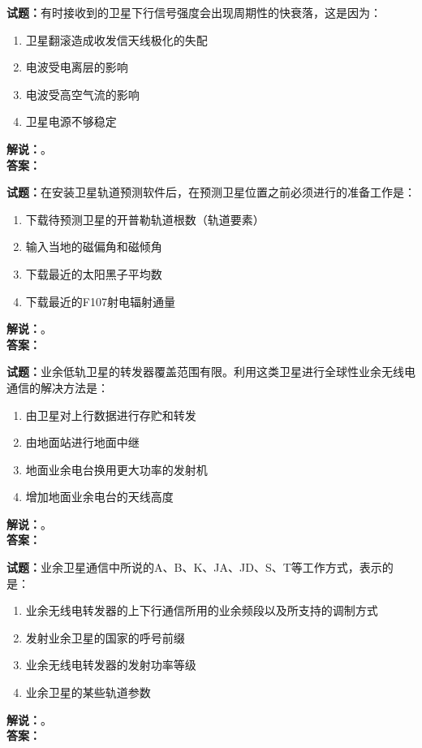 \documentclass{ctexbook}
\begin{document}
\noindent\textbf{试题：}有时接收到的卫星下行信号强度会出现周期性的快衰落，这是因为：
\begin{enumerate}[leftmargin=3em]
  \item 卫星翻滚造成收发信天线极化的失配
  \item 电波受电离层的影响
  \item 电波受高空气流的影响
  \item 卫星电源不够稳定
\end{enumerate}
\noindent\textbf{解说：}\textbf{}。\\\noindent\textbf{答案：}

\vspace{\baselineskip}

\noindent\textbf{试题：}在安装卫星轨道预测软件后，在预测卫星位置之前必须进行的准备工作是：
\begin{enumerate}[leftmargin=3em]
  \item 下载待预测卫星的开普勒轨道根数（轨道要素）
  \item 输入当地的磁偏角和磁倾角
  \item 下载最近的太阳黑子平均数
  \item 下载最近的F107射电辐射通量
\end{enumerate}
\noindent\textbf{解说：}\textbf{}。\\\noindent\textbf{答案：}

\vspace{\baselineskip}

\noindent\textbf{试题：}业余低轨卫星的转发器覆盖范围有限。利用这类卫星进行全球性业余无线电通信的解决方法是：
\begin{enumerate}[leftmargin=3em]
  \item 由卫星对上行数据进行存贮和转发
  \item 由地面站进行地面中继
  \item 地面业余电台换用更大功率的发射机
  \item 增加地面业余电台的天线高度
\end{enumerate}
\noindent\textbf{解说：}\textbf{}。\\\noindent\textbf{答案：}

\vspace{\baselineskip}

\noindent\textbf{试题：}业余卫星通信中所说的A、B、K、JA、JD、S、T等工作方式，表示的是：
\begin{enumerate}[leftmargin=3em]
  \item 业余无线电转发器的上下行通信所用的业余频段以及所支持的调制方式
  \item 发射业余卫星的国家的呼号前缀
  \item 业余无线电转发器的发射功率等级
  \item 业余卫星的某些轨道参数
\end{enumerate}
\noindent\textbf{解说：}\textbf{}。\\\noindent\textbf{答案：}
\end{document}
